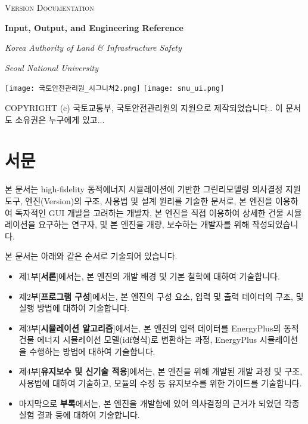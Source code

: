 \documentclass[oneside,openany,a4paper,12pt]{book}
\begin{document}
\pagestyle{plain} 


\listoftodos

\begin{titlepage}
  \centering
  {\scshape\large \simulator Version \releaseversion Documentation\par}
  \vspace{6em}
  {\bfseries\Huge Input, Output, and Engineering Reference\par}
  \vspace{1em}
  {\itshape\Large Korea Authority of Land \& Infrastructure Safety\par}
  {\itshape\Large Seoul National University\par}
  \vfill
  \texttt{[image: 국토안전관리원\_시그니처2.png]}
  \hspace{4em}
  \texttt{[image: snu\_ui.png]}
  \vfill
  {\large \releasedate \par}
  \vspace{0.5em}
  {\small COPYRIGHT (c) \simulator\는 국토교통부, 국토안전관리원의 지원으로 제작되었습니다.. 이 문서도 소유권은 누구에게 있고...}
\end{titlepage}

\section*{서문}
본 문서는 high-fidelity 동적에너지 시뮬레이션에 기반한 그린리모델링 의사결정 지원 도구, \simulator 엔진(Version\releaseversion)의 구조, 사용법 및 설계 원리를 기술한 문서로, 본 엔진을 이용하여 독자적인 GUI 개발을 고려하는 개발자, 본 엔진을 직접 이용하여 상세한 건물 시뮬레이션을 요구하는 연구자, 및 본 엔진을 개량, 보수하는 개발자를 위해 작성되었습니다.

본 문서는 아래와 같은 순서로 기술되어 있습니다.
\begin{itemize}
  \item 제1부[{\bfseries 서론}]에서는, 본 엔진의 개발 배경 및 기본 철학에 대하여 기술합니다.
  \item 제2부[{\bfseries 프로그램 구성}]에서는, 본 엔진의 구성 요소, 입력 및 출력 데이터의 구조, 및 실행 방법에 대하여 기술합니다.
  \item 제3부[{\bfseries 시뮬레이션 알고리즘}]에서는, 본 엔진의 입력 데이터를 EnergyPlus의 동적 건물 에너지 시뮬레이션 모델(idf형식)로 변환하는 과정, EnergyPlus 시뮬레이션을 수행하는 방법에 대하여 기술합니다.
  \item 제4부[{\bfseries 유지보수 및 신기술 적용}]에서는, 본 엔진을 위해 개발된  개발 과정 및 구조, 사용법에 대하여 기술하고, 모듈의 수정 등 유지보수를 위한 가이드를 기술합니다.
  \item 마지막으로 {\bfseries 부록}에서는, 본 엔진을 개발함에 있어 의사결정의 근거가 되었던 각종 실험 결과 등에 대하여 기술합니다.
\end{itemize}
\end{document}
